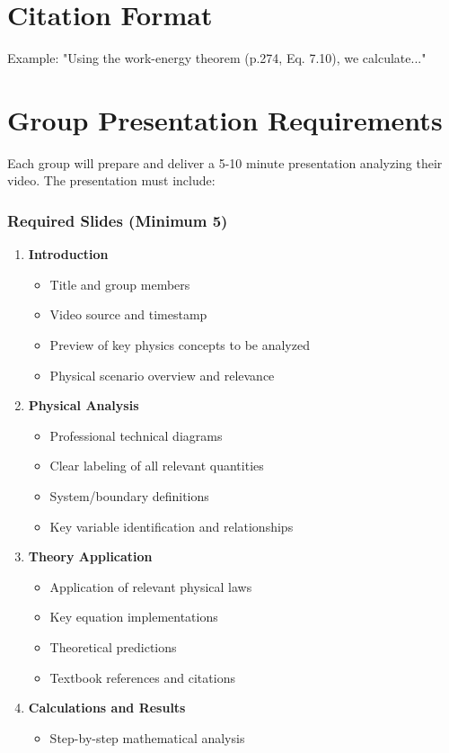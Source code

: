 \documentclass[12pt]{article}
\begin{document}
\section{Citation Format}
Example: "Using the work-energy theorem (p.274, Eq. 7.10), we calculate..."

\section{Group Presentation Requirements}
Each group will prepare and deliver a 5-10 minute presentation analyzing their video. The presentation must include:
\subsubsection{Required Slides (Minimum 5)}
\begin{enumerate}[label=\textbf{Slide \arabic*.}]
\item \textbf{Introduction}
\begin{itemize}
\item Title and group members
\item Video source and timestamp
\item Preview of key physics concepts to be analyzed
\item Physical scenario overview and relevance
\end{itemize}
\item \textbf{Physical Analysis}
\begin{itemize}
\item Professional technical diagrams
\item Clear labeling of all relevant quantities
\item System/boundary definitions
\item Key variable identification and relationships
\end{itemize}
\item \textbf{Theory Application}
\begin{itemize}
\item Application of relevant physical laws
\item Key equation implementations
\item Theoretical predictions
\item Textbook references and citations
\end{itemize}
\item \textbf{Calculations and Results}
\begin{itemize}
\item Step-by-step mathematical analysis

\end{itemize}
\end{enumerate}
\end{document}
